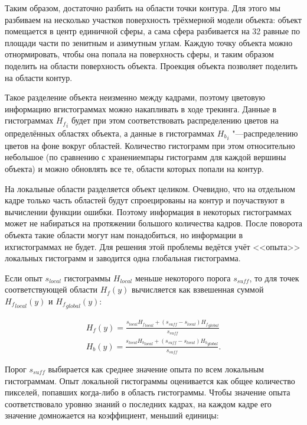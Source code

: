 Таким образом, достаточно разбить на области точки контура.
Для этого мы разбиваем на несколько участков поверхность трёхмерной модели
объекта: объект помещается в центр единичной сферы, а сама сфера разбивается
на 32 равные по площади части по зенитным и азимутным углам.
Каждую точку объекта можно отнормировать, чтобы она попала на поверхность
сферы, и таким образом поделить на области поверхность объекта.
Проекция объекта позволяет поделить на области контур.

Такое разделение объекта неизменно между кадрами, поэтому цветовую информацию
вгистограммах можно накапливать в ходе трекинга.
Данные в гистограммах ${H_f}_i$ будет при этом соответствовать распределению
цветов на определённых областях объекта, а данные в гистограммах ${H_b}_i$
"---распределению цветов на фоне вокруг областей.
Количество гистограмм при этом относительно небольшое (по сравнению с
хранениемпары гистограмм для каждой вершины объекта) и можно обновлять все те,
области
которых попали на контур.

На локальные области разделяется объект целиком. 
Очевидно, что на отдельном кадре только часть областей будут спроецированы на
контур и поучаствуют в вычислении функции ошибки.
Поэтому информация в некоторых гистограммах может не набираться на протяжении
большого количества кадров.
После поворота объекта такие области могут нам понадобиться, но информации в
ихгистограммах не будет.
Для решения этой проблемы ведётся учёт <<опыта>> локальных гистограмм и
заводится одна глобальная гистограмма.

Если опыт $s_{local}$ гистограммы $H_{local}$ меньше некоторого порога
$s_{suff}$, то для точек соответствующей области $H_f(y)$ вычисляется как
взвешенная суммой ${H_f}_{local}(y)$ и ${H_f}_{global}(y)$:

\begin{equation}
\label{eqn:histo_skill}
\begin{array}{c}
H_f(y) = \frac{s_{local} {H_f}_{local} + (s_{suff} - s_{local})
{H_f}_{global}}{s_{suff}} \\
H_b(y) = \frac{s_{local} {H_b}_{local} + (s_{suff} - s_{local})
{H_b}_{global}}{s_{suff}}
\text{.}
\end{array}
\end{equation}

Порог $s_{suff}$ выбирается как среднее значение опыта по всем локальным
гистограммам.
Опыт локальной гистограммы оценивается как общее количество пикселей, попавших
когда-либо в область гистограммы.
Чтобы значение опыта соответствовало уровню знаний о последних кадрах, на
каждом кадре его значение домножается на коэффициент, меньший единицы:

